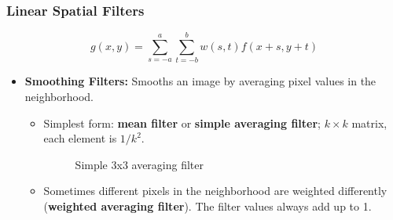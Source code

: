 \subsubsection*{Linear Spatial Filters}

\begin{equation*}
  g(x, y) = \sum_{s=-a}^{a} \sum_{t=-b}^{b} w(s, t) f(x + s, y + t)
\end{equation*}

\begin{itemize}
  \item \textbf{Smoothing Filters:} Smooths an image by averaging
    pixel values in the neighborhood.
    \begin{itemize}
      \item Simplest form: \textbf{mean filter} or \textbf{simple
        averaging filter}; $k \times k$ matrix, each
        element is $1/k^2$.

        \begin{minipage}{\linewidth}
          \vspace{-0.3cm}
          \begin{figure}[H]
            \centering
            \caption{Simple 3x3 averaging filter}
          \end{figure}
        \end{minipage}
      \item Sometimes different pixels in the neighborhood are
        weighted differently (\textbf{weighted averaging filter}).
        The filter values always add up to 1.


\end{itemize}
\end{itemize}
